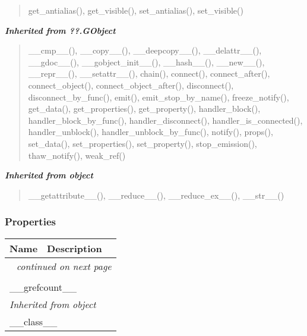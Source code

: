 \begin{quote}
get\_antialias(), get\_visible(), set\_antialias(), set\_visible()
\end{quote}

\large{\textbf{\textit{Inherited from ??.GObject}}}

\begin{quote}
\_\_cmp\_\_(), \_\_copy\_\_(), \_\_deepcopy\_\_(), \_\_delattr\_\_(), \_\_gdoc\_\_(), \_\_gobject\_init\_\_(), \_\_hash\_\_(), \_\_new\_\_(), \_\_repr\_\_(), \_\_setattr\_\_(), chain(), connect(), connect\_after(), connect\_object(), connect\_object\_after(), disconnect(), disconnect\_by\_func(), emit(), emit\_stop\_by\_name(), freeze\_notify(), get\_data(), get\_properties(), get\_property(), handler\_block(), handler\_block\_by\_func(), handler\_disconnect(), handler\_is\_connected(), handler\_unblock(), handler\_unblock\_by\_func(), notify(), props(), set\_data(), set\_properties(), set\_property(), stop\_emission(), thaw\_notify(), weak\_ref()
\end{quote}

\large{\textbf{\textit{Inherited from object}}}

\begin{quote}
\_\_getattribute\_\_(), \_\_reduce\_\_(), \_\_reduce\_ex\_\_(), \_\_str\_\_()
\end{quote}


  \subsubsection{Properties}

    \vspace{-1cm}
\hspace{\varindent}\begin{longtable}{|p{\varnamewidth}|p{\vardescrwidth}|l}
\cline{1-2}
\cline{1-2} \centering \textbf{Name} & \centering \textbf{Description}& \\
\cline{1-2}
\endhead\cline{1-2}\multicolumn{3}{r}{\small\textit{continued on next page}}\\\endfoot\cline{1-2}
\endlastfoot\multicolumn{2}{|l|}{\textit{Inherited from ??.GObject}}\\
\multicolumn{2}{|p{\varwidth}|}{\raggedright \_\_grefcount\_\_}\\
\cline{1-2}
\multicolumn{2}{|l|}{\textit{Inherited from object}}\\
\multicolumn{2}{|p{\varwidth}|}{\raggedright \_\_class\_\_}\\
\cline{1-2}
\end{longtable}


